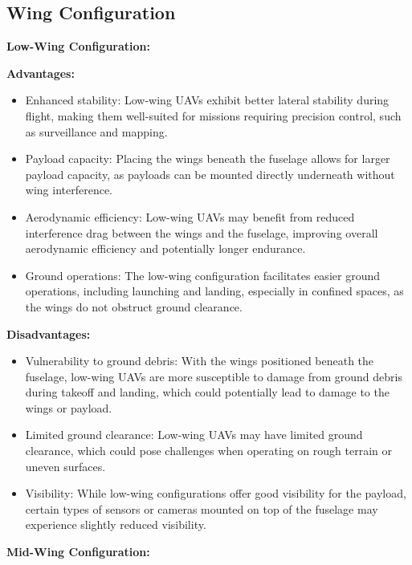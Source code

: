 \documentclass[12 pt]{article}
\begin{document}
\subsection{Wing Configuration}




{\textbf{Low-Wing Configuration:}}

{\color{black}
\textbf{{Advantages:}}
\begin{itemize}
  \item Enhanced stability: Low-wing UAVs exhibit better lateral stability during flight, making them well-suited for missions requiring precision control, such as surveillance and mapping.
  \item Payload capacity: Placing the wings beneath the fuselage allows for larger payload capacity, as payloads can be mounted directly underneath without wing interference.
  \item Aerodynamic efficiency: Low-wing UAVs may benefit from reduced interference drag between the wings and the fuselage, improving overall aerodynamic efficiency and potentially longer endurance.
  \item Ground operations: The low-wing configuration facilitates easier ground operations, including launching and landing, especially in confined spaces, as the wings do not obstruct ground clearance.
\end{itemize}

\textbf{{Disadvantages:}}
\begin{itemize}
  \item Vulnerability to ground debris: With the wings positioned beneath the fuselage, low-wing UAVs are more susceptible to damage from ground debris during takeoff and landing, which could potentially lead to damage to the wings or payload.
  \item Limited ground clearance: Low-wing UAVs may have limited ground clearance, which could pose challenges when operating on rough terrain or uneven surfaces.
  \item Visibility: While low-wing configurations offer good visibility for the payload, certain types of sensors or cameras mounted on top of the fuselage may experience slightly reduced visibility.
\end{itemize}
}

{\textbf{Mid-Wing Configuration:}}
\end{document}
